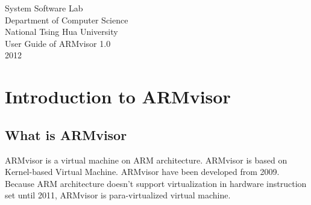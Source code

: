 \documentclass[12pt]{article}  %
\begin{document}
\begin{titlepage}  %
\begin{center}
\Large System Software Lab\\
\Large Department of Computer Science\\
\Large National Tsing Hua University\\
\vspace*{20ex}
\huge User Guide of ARMvisor 1.0\\
\vspace*{35ex}
\Large 2012
\end{center}
\end{titlepage}


\tableofcontents  %
\newpage


\section{Introduction to ARMvisor}
\subsection{What is ARMvisor}

ARMvisor is a virtual machine on ARM architecture. ARMvisor is based on Kernel-based Virtual Machine. ARMvisor have been developed from 2009. Because ARM architecture doesn’t  support virtualization in hardware instruction set until 2011, ARMvisor is para-virtualized virtual machine.
\end{document}
